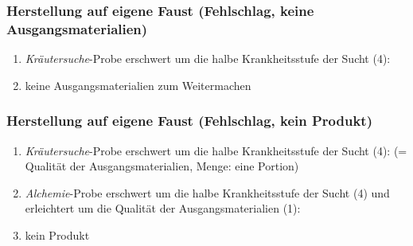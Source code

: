 \subsubsection{Herstellung auf eigene Faust (Fehlschlag, keine Ausgangsmaterialien)}
\begin{enumerate}
	\item \emph{Kräutersuche}-Probe erschwert um die halbe Krankheitsstufe der Sucht (4): 
	\item keine Ausgangsmaterialien zum Weitermachen
\end{enumerate}

\subsubsection{Herstellung auf eigene Faust (Fehlschlag, kein Produkt)}
\begin{enumerate}
	\item \emph{Kräutersuche}-Probe erschwert um die halbe Krankheitsstufe der Sucht (4):  (= Qualität der Ausgangsmaterialien, Menge: eine Portion)
	\item \emph{Alchemie}-Probe erschwert um die halbe Krankheitsstufe der Sucht (4) und erleichtert um die Qualität der Ausgangsmaterialien (1): 
	\item kein Produkt
\end{enumerate}

